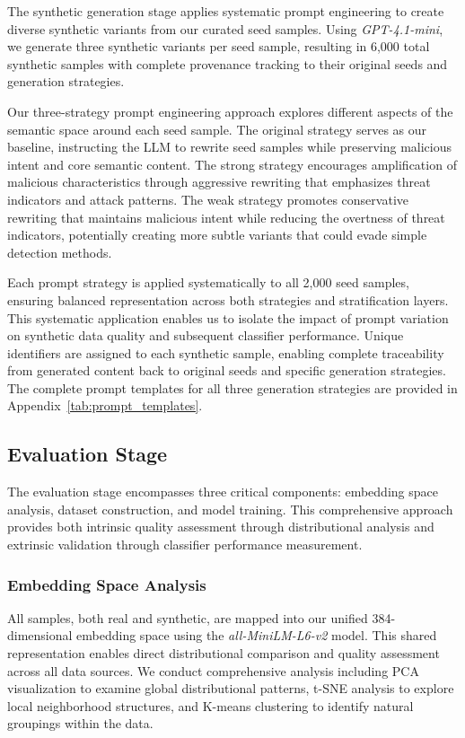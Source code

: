 The synthetic generation stage applies systematic prompt engineering to create diverse synthetic variants from our curated seed samples. Using \textit{GPT-4.1-mini}, we generate three synthetic variants per seed sample, resulting in 6,000 total synthetic samples with complete provenance tracking to their original seeds and generation strategies.

Our three-strategy prompt engineering approach explores different aspects of the semantic space around each seed sample. The original strategy serves as our baseline, instructing the LLM to rewrite seed samples while preserving malicious intent and core semantic content. The strong strategy encourages amplification of malicious characteristics through aggressive rewriting that emphasizes threat indicators and attack patterns. The weak strategy promotes conservative rewriting that maintains malicious intent while reducing the overtness of threat indicators, potentially creating more subtle variants that could evade simple detection methods.

Each prompt strategy is applied systematically to all 2,000 seed samples, ensuring balanced representation across both strategies and stratification layers. This systematic application enables us to isolate the impact of prompt variation on synthetic data quality and subsequent classifier performance. Unique identifiers are assigned to each synthetic sample, enabling complete traceability from generated content back to original seeds and specific generation strategies. The complete prompt templates for all three generation strategies are provided in Appendix~\ref{tab:prompt_templates}.

\subsection{Evaluation Stage}

The evaluation stage encompasses three critical components: embedding space analysis, dataset construction, and model training. This comprehensive approach provides both intrinsic quality assessment through distributional analysis and extrinsic validation through classifier performance measurement.

\subsubsection{Embedding Space Analysis}

All samples, both real and synthetic, are mapped into our unified 384-dimensional embedding space using the \textit{all-MiniLM-L6-v2} model. This shared representation enables direct distributional comparison and quality assessment across all data sources. We conduct comprehensive analysis including PCA visualization to examine global distributional patterns, t-SNE analysis to explore local neighborhood structures, and K-means clustering to identify natural groupings within the data.

